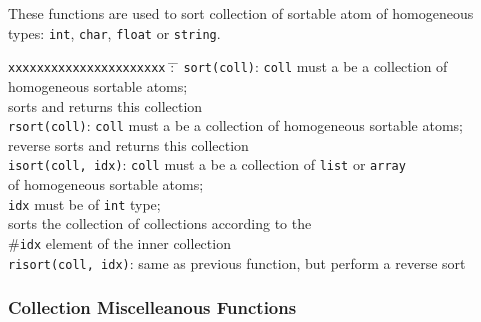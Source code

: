 These functions are used to sort collection of sortable atom of homogeneous
types: \texttt{int}, \texttt{char}, \texttt{float} or \texttt{string}.
\begin{tabbing}
\texttt{xxxxxxxxxxxxxxxxxxxxxx} \= : \=\kill
\texttt{sort(coll)}\>: \texttt{coll} must a be a collection of homogeneous
sortable atoms;\\
\>\> sorts and returns this collection\\
\texttt{rsort(coll)}\>: \texttt{coll} must a be a collection of homogeneous
sortable atoms;\\
\>\> reverse sorts and returns this collection\\
\texttt{isort(coll, idx)}\>: \texttt{coll} must a be a collection of \texttt{list}
or \texttt{array}\\
                     \>\> of homogeneous sortable atoms;\\
                     \>\>\texttt{idx} must be of \texttt{int} type;\\
	\>\>sorts the collection of collections according to the\\
\>\> \#\texttt{idx} element
of the inner collection\\
\texttt{risort(coll, idx)}\>: same as previous function, but perform a reverse sort
\end{tabbing}

\subsubsection{Collection Miscelleanous Functions}


